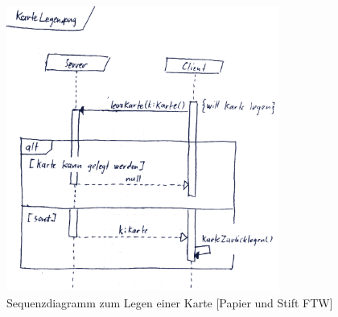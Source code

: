 \begin{figure}[hbt]
  \centering
  \includegraphics[width=0.80\textwidth,angle=0]{graphics/KarteLegen.png}
  \caption{Sequenzdiagramm zum Legen einer Karte [Papier und Stift FTW] \hfill{} }
 \end{figure}
